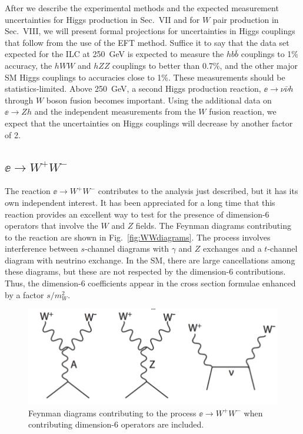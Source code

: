 After we describe the experimental methods and the expected measurement uncertainties for Higgs production in  Sec.~VII and for $W$ pair production in Sec.~VIII,  we will present formal  projections for uncertainties in 
Higgs couplings that follow from the use of the EFT  method.  Suffice it to say that the data set expected for the ILC at 250~GeV is expected to measure the $hb\bar b$ couplings to 1\% accuracy, the $hWW$ and $hZZ$ couplings to better than 0.7\%, and the other 
major SM Higgs couplings to accuracies close to 1\%.    These measurements should be 
statistics-limited.  Above 250~GeV, a second Higgs production reaction, $\ee\to \nu\bar\nu h$ through $W$ boson fusion becomes important.  Using the additional data on $\ee\to Zh$ and the independent measurements from the $W$ fusion reaction, we expect that the uncertainties on Higgs couplings will decrease by another factor of 2. 


\subsection{$\ee \to W^+W^-$}
\label{subsec:phys_WW}
The reaction $\ee\to W^+W^-$ contributes to the analysis just described, but it has its own independent interest.  It has been appreciated for  a long time that this reaction provides an excellent way to test for the presence of dimension-6 operators that involve the $W$ and $Z$ fields.   The Feynman diagrams contributing to the reaction are shown in Fig.~\ref{fig:WWdiagrams}.   The process involves interference between $s$-channel diagrams with $\gamma$ and $Z$ exchanges and a $t$-channel diagram with neutrino exchange.  In the SM, there are large cancellations among these diagrams, but these are not respected by the dimension-6 contributions.   Thus, the dimension-6 coefficients appear in the cross section formulae enhanced by a factor $s/m_W^2$. 

\begin{figure}
\begin{center}
\includegraphics[width=0.80\hsize]{chapters/figures/WWdiagrams.pdf}
\end{center}
\caption{Feynman diagrams contributing to the process $\ee\to W^+W^-$ when contributing  dimension-6 operators are included.}
\label{fig:eeWWdiagrams}
\end{figure}

